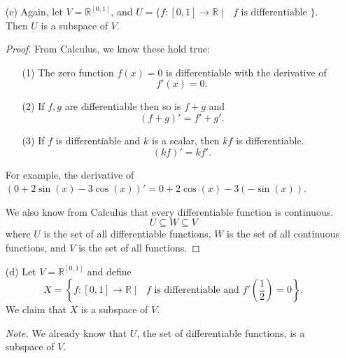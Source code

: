 \documentclass[11pt]{article}
\begin{document}
\begin{enumerate}
        \item[(c)] Again, let \(V = \mathbb{R}^{[0,1]}\), and \(U = \{f: [0,1] \rightarrow \mathbb{R} \mid \text{ $f$ is differentiable }\}.\) Then $U$ is a subspace of $V$.
        \begin{proof}
            From Calculus, we know these hold true:
            \begin{enumerate}
                \item[(1)] The zero function \(f(x) = 0\) is differentiable with the derivative of \[f'(x) = 0.\]
                \item[(2)] If $f,g$ are differentiable then so is $f+g$ and \[(f+g)' = f' + g'.\]
                \item[(3)] If $f$ is differentiable and $k$ is a scalar, then $kf$ is differentiable. \[(kf)' = kf'.\]  
            \end{enumerate}
            For example, the derivative of \((0 + 2 \sin(x) - 3 \cos(x))' = 0 + 2 \cos(x) - 3(-\sin(x))\).

            We also know from Calculus that every differentiable function is continuous.
            \[U \subseteq W \subseteq V\] where $U$ is the set of all differentiable functions, $W$ is the set of all continuous functions, and $V$ is the set of all functions.
        \end{proof} 

        \item[(d)] Let \(V = \mathbb{R}^{[0,1]}\) and define \[X = \left\{ f:[0,1] \rightarrow \mathbb{R} \mid \text{ $f$ is differentiable and $f' \left( \frac{1}{2} \right) = 0$}\right\}.\] We claim that $X$ is a subspace of $V$.
        
        \emph{Note.} We already know that $U$, the set of differentiable functions, is a subspace of $V$.
        

\end{enumerate}
\end{document}
